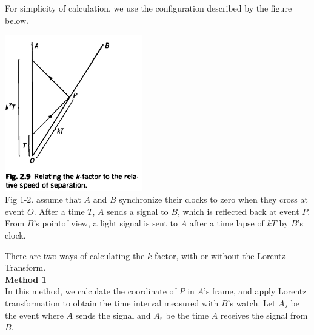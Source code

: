 \documentclass[9pt,oneside,headheight=10mm]{book}
\newcommand{\blue}{\color{blue}}
\newcommand{\black}{\color{black}}
\newcommand{\bluebf}[1]{\textbf{\blue #1\black}}
\begin{document}
	\begin{multicols}{2}
	For simplicity of calculation, we use the configuration described by the figure below.
	\begin{center}
	\includegraphics[width=6cm]{Chap1/1-2}\\
	Fig 1-2. assume that $A$ and $B$ synchronize their clocks to zero when they cross at event $O$. After a time $T$, $A$ sends a signal to $B$, which is reflected back at event $P$. From $B$'s pointof view, a light signal is sent to $A$ after a time lapse of $kT$ by $B$'s clock.
	\end{center}
	There are two ways of calculating the $k$-factor, with or without the Lorentz Transform.\\

	\bluebf{Method 1}\\
	
	In this method, we calculate the coordinate of $P$ in $A$'s frame, and apply Lorentz transformation to obtain the time interval measured with $B$'s watch. Let $A_s$ be the event where $A$ sends the signal and $A_r$ be the time $A$ receives the signal from $B$.
	

\end{multicols}
\end{document}
